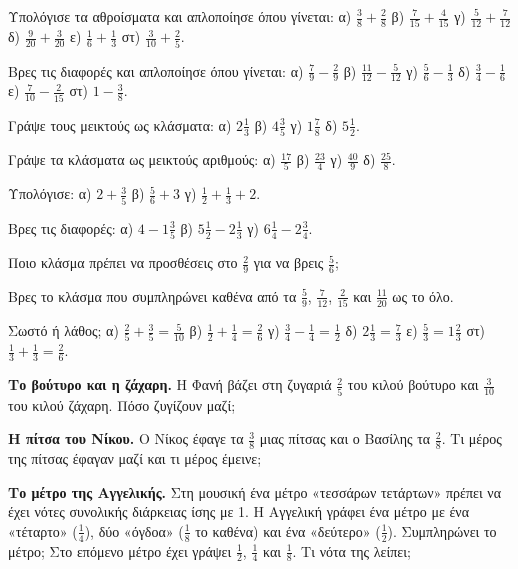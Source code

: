 

\ex Υπολόγισε τα αθροίσματα και απλοποίησε όπου γίνεται: α) $\frac{3}{8}+\frac{2}{8}$ \quad β) $\frac{7}{15}+\frac{4}{15}$ \quad γ) $\frac{5}{12}+\frac{7}{12}$ \quad δ) $\frac{9}{20}+\frac{3}{20}$ \quad ε) $\frac{1}{6}+\frac{1}{3}$ \quad στ) $\frac{3}{10}+\frac{2}{5}$.

\ex Βρες τις διαφορές και απλοποίησε όπου γίνεται: α) $\frac{7}{9}-\frac{2}{9}$ \quad β) $\frac{11}{12}-\frac{5}{12}$ \quad γ) $\frac{5}{6}-\frac{1}{3}$ \quad δ) $\frac{3}{4}-\frac{1}{6}$ \quad ε) $\frac{7}{10}-\frac{2}{15}$ \quad στ) $1-\frac{3}{8}$.

\ex Γράψε τους μεικτούς ως κλάσματα: α) $2\frac{1}{3}$ \quad β) $4\frac{3}{5}$ \quad γ) $1\frac{7}{8}$ \quad δ) $5\frac{1}{2}$.

\ex Γράψε τα κλάσματα ως μεικτούς αριθμούς: α) $\frac{17}{5}$ \quad β) $\frac{23}{4}$ \quad γ) $\frac{40}{9}$ \quad δ) $\frac{25}{8}$.

\ex Υπολόγισε: α) $2+\frac{3}{5}$ \quad β) $\frac{5}{6}+3$ \quad γ) $\frac{1}{2}+\frac{1}{3}+2$.

\ex Βρες τις διαφορές: α) $4-1\frac{3}{5}$ \quad β) $5\frac{1}{2}-2\frac{1}{3}$ \quad γ) $6\frac{1}{4}-2\frac{3}{4}$.

\ex Ποιο κλάσμα πρέπει να προσθέσεις στο $\frac{2}{9}$ για να βρεις $\frac{5}{6}$;

\ex Βρες το κλάσμα που συμπληρώνει καθένα από τα $\frac{5}{9}$, $\frac{7}{12}$, $\frac{2}{15}$ και $\frac{11}{20}$ ως το όλο.

\ex Σωστό ή λάθος; α) $\frac{2}{5}+\frac{3}{5}=\frac{5}{10}$ \quad β) $\frac{1}{2}+\frac{1}{4}=\frac{2}{6}$ \quad γ) $\frac{3}{4}-\frac{1}{4}=\frac{1}{2}$ \quad δ) $2\frac{1}{3}=\frac{7}{3}$ \quad ε) $\frac{5}{3}=1\frac{2}{3}$ \quad στ) $\frac{1}{3}+\frac{1}{3}=\frac{2}{6}$.


\ex \textbf{Το βούτυρο και η ζάχαρη.} Η Φανή βάζει στη ζυγαριά $\frac{2}{5}$ του κιλού βούτυρο και $\frac{3}{10}$ του κιλού ζάχαρη. Πόσο ζυγίζουν μαζί;

\ex \textbf{Η πίτσα του Νίκου.} Ο Νίκος έφαγε τα $\frac{3}{8}$ μιας πίτσας και ο Βασίλης τα $\frac{2}{8}$. Τι μέρος της πίτσας έφαγαν μαζί και τι μέρος έμεινε;

\ex \textbf{Το μέτρο της Αγγελικής.} Στη μουσική ένα μέτρο «τεσσάρων τετάρτων» πρέπει να έχει νότες συνολικής διάρκειας ίσης με 1. Η Αγγελική γράφει ένα μέτρο με ένα «τέταρτο» ($\frac{1}{4}$), δύο «όγδοα» ($\frac{1}{8}$ το καθένα) και ένα «δεύτερο» ($\frac{1}{2}$). Συμπληρώνει το μέτρο; Στο επόμενο μέτρο έχει γράψει $\frac{1}{2}$, $\frac{1}{4}$ και $\frac{1}{8}$. Τι νότα της λείπει;


